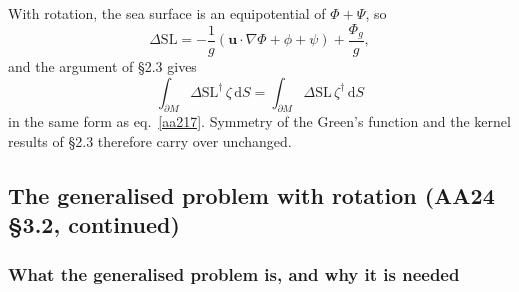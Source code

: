 \documentclass[11pt,a4paper]{article}
\newcommand{\bu}{\mathbf{u}}
\newcommand{\dSL}{\Delta\mathrm{SL}}
\newcommand{\dd}{\,\mathrm{d}}
\newcommand{\pM}{\partial M}
\begin{document}
With rotation, the sea surface is an equipotential of $\Phi+\Psi$, so
\begin{equation}
  \dSL=-\frac{1}{g}(\bu\cdot\nabla\Phi+\phi+\psi)+\frac{\Phi_g}{g},
  \tag{3.18}\label{aa318}
\end{equation}
and the argument of \S2.3 gives
\begin{equation}
  \boxed{\;\int_{\pM}\dSL^\dagger\,\zeta\dd S=\int_{\pM}\dSL\,\zeta^\dagger\dd S\;}
  \tag{3.19}\label{aa319}
\end{equation}
in the same form as eq.~\eqref{aa217}. Symmetry of the Green's function and the kernel results of
\S2.3 therefore carry over unchanged.

\subsection{The generalised problem with rotation (AA24 \S3.2, continued)}
\label{sec:gen_rot}

\subsubsection{What the generalised problem is, and why it is needed}
\end{document}
